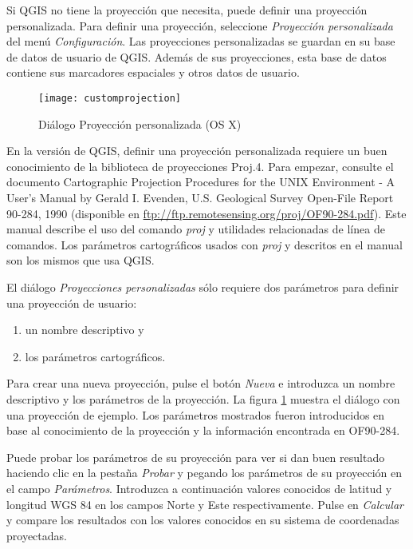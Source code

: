 Si QGIS no tiene la proyección que necesita, puede definir una proyección personalizada. Para definir una proyección, seleccione \textit{Proyección personalizada} del menú \textit{Configuración}. Las proyecciones personalizadas se guardan en su base de datos de usuario de QGIS. Además de sus proyecciones, esta base de datos contiene sus marcadores espaciales y otros datos de usuario. 

\begin{figure}[ht]
   \begin{center}
   \caption{Diálogo Proyección personalizada (OS X)}\label{fig:customprojections}\smallskip
   \texttt{[image: customprojection]}
\end{center}  
\end{figure}

En la versión \CURRENT de QGIS, definir una proyección personalizada requiere un buen conocimiento de la biblioteca de proyecciones Proj.4. Para empezar, consulte el documento Cartographic Projection Procedures for the UNIX Environment - A User's Manual
by Gerald I. Evenden, U.S. Geological Survey Open-File Report 90-284, 1990
(disponible en \url{ftp://ftp.remotesensing.org/proj/OF90-284.pdf}).
Este manual describe el uso del comando \textit{proj} y utilidades relacionadas de línea de comandos. Los parámetros cartográficos usados con \textit{proj} y descritos en el manual son los mismos que usa QGIS. 

El diálogo \textit{Proyecciones personalizadas} sólo requiere dos parámetros para definir una proyección de usuario: 
\begin{enumerate}
\item un nombre descriptivo y
\item los parámetros cartográficos. 
\end{enumerate}
Para crear una nueva proyección, pulse el botón \textit{Nueva} e introduzca un nombre descriptivo y los parámetros de la proyección. La figura \ref{fig:customprojections} muestra el diálogo con una proyección de ejemplo. Los parámetros mostrados fueron introducidos en base al conocimiento de la proyección y la información encontrada en OF90-284.

Puede probar los parámetros de su proyección para ver si dan buen resultado haciendo clic en la pestaña \textit{Probar} y pegando los parámetros de su proyección en el campo \textit{Parámetros}. Introduzca a continuación valores conocidos de latitud y longitud WGS 84 en los campos Norte y Este respectivamente. Pulse en \textit{Calcular} y compare los resultados con los valores conocidos en su sistema de coordenadas proyectadas. 
